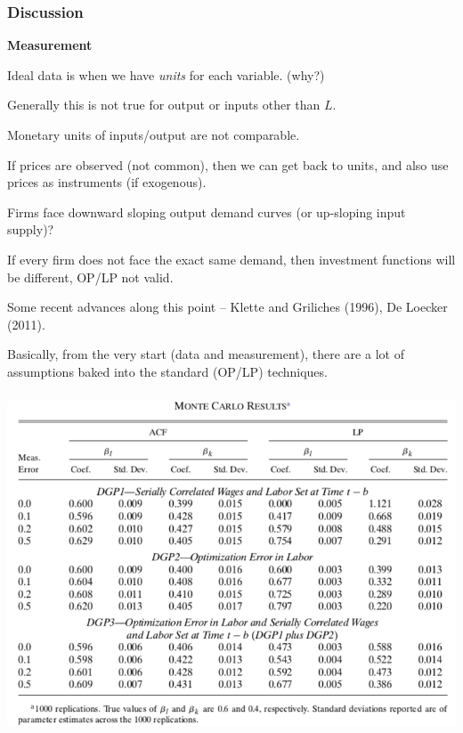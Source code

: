 \documentclass[11pt, aspectratio=169]{beamer}
\newenvironment{wideitemize}{\itemize\addtolength{\itemsep}{10pt}}{\enditemize}
\begin{document}
\begin{frame}[c]\frametitle{Discussion}
    

\bigskip
\textbf{Measurement}
\begin{wideitemize}
	\item Ideal data is when we have \emph{units} for each variable. (why?)
	\item Generally this is not true for output or inputs other than $L$.
	\begin{wideitemize}
		\item Monetary units of inputs/output are not comparable.
		\item If prices are observed (not common), then we can get back to units, and also use prices as instruments (if exogenous).
	\end{wideitemize}
	\item Firms face downward sloping output demand curves (or up-sloping input supply)?
	\begin{wideitemize}
			\item If every firm does not face the exact same demand, then investment functions will be different, OP/LP not valid. 
			\item Some recent advances along this point --  Klette and Griliches (1996), De Loecker (2011). 
	\end{wideitemize}			
	\item Basically, from the very start (data and measurement), there are a lot of assumptions baked into the standard (OP/LP) techniques.
\end{wideitemize}

\end{frame}

\begin{frame}[c]\frametitle{}
\centering
\includegraphics[scale=.42]{ACF - Table1.png}

\end{frame}
\end{document}
